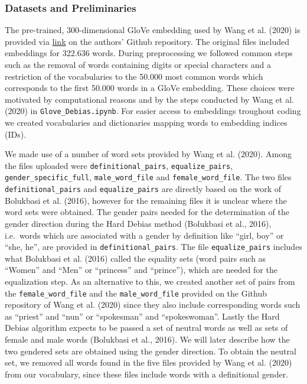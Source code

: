 \documentclass[
  english,
  man,floatsintext]{apa6}
\begin{document}
\hypertarget{datasets-and-preliminaries}{%
\subsubsection{Datasets and Preliminaries}\label{datasets-and-preliminaries}}

The pre-trained, 300-dimensional GloVe embedding used by Wang et al. (2020) is provided via \href{http://www.cs.virginia.edu/~tw8cb/word_embeddings/}{link} on the authors' Github repository. The original files included embeddings for 322.636 words. During preprocessing we followed common steps such as the removal of words containing digits or special characters and a restriction of the vocabularies to the 50.000 most common words which corresponds to the first 50.000 words in a GloVe embedding. These choices were motivated by computational reasons and by the steps conducted by Wang et al. (2020) in \texttt{Glove\_Debias.ipynb}. For easier access to embeddings troughout coding we created vocabularies and dictionaries mapping words to embedding indices (IDs).

We made use of a number of word sets provided by Wang et al. (2020). Among the files uploaded were \texttt{definitional\_pairs}, \texttt{equalize\_pairs}, \texttt{gender\_specific\_full}, \texttt{male\_word\_file} and \texttt{female\_word\_file}. The two files \texttt{definitional\_pairs} and \texttt{equalize\_pairs} are directly based on the work of Bolukbasi et al. (2016), however for the remaining files it is unclear where the word sets were obtained. The gender pairs needed for the determination of the gender direction during the Hard Debias method (Bolukbasi et al., 2016), i.e.~words which are associated with a gender by definition like \enquote{girl, boy} or \enquote{she, he}, are provided in \texttt{definitional\_pairs}. The file \texttt{equalize\_pairs} includes what Bolukbasi et al. (2016) called the equality sets (word pairs such as \enquote{Women} and \enquote{Men} or \enquote{princess} and \enquote{prince}), which are needed for the equalization step. As an alternative to this, we created another set of pairs from the \texttt{female\_word\_file} and the \texttt{male\_word\_file} provided on the Github repository of Wang et al. (2020) since they also include corresponding words such as \enquote{priest} and \enquote{nun} or \enquote{spokesman} and \enquote{spokeswoman}. Lastly the Hard Debias algorithm expects to be passed a set of neutral words as well as sets of female and male words (Bolukbasi et al., 2016). We will later describe how the two gendered sets are obtained using the gender direction. To obtain the neutral set, we removed all words found in the five files provided by Wang et al. (2020) from our vocabulary, since these files include words with a definitional gender.
\end{document}
